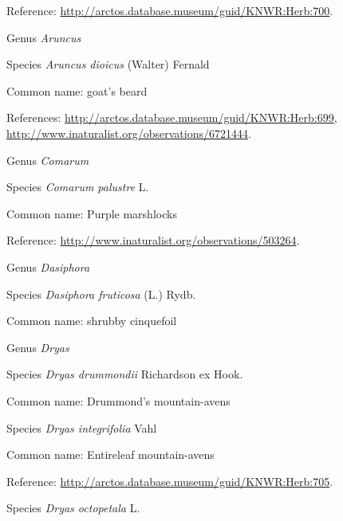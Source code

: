 \documentclass[9pt, article]{memoir}
\begin{document}
\begin{multicols}{2}
Reference: 
\url{http://arctos.database.museum/guid/KNWR:Herb:700}.

\vspace{6pt}\noindent\hspace{30pt}Genus \textit{Aruncus}


\vspace{6pt}\noindent\hspace{36pt}Species \textit{Aruncus dioicus} (Walter) Fernald


Common name: goat's beard

References: 
\url{http://arctos.database.museum/guid/KNWR:Herb:699}, 
\url{http://www.inaturalist.org/observations/6721444}.

\vspace{6pt}\noindent\hspace{30pt}Genus \textit{Comarum}


\vspace{6pt}\noindent\hspace{36pt}Species \textit{Comarum palustre} L.


Common name: Purple marshlocks

Reference: 
\url{http://www.inaturalist.org/observations/503264}.

\vspace{6pt}\noindent\hspace{30pt}Genus \textit{Dasiphora}


\vspace{6pt}\noindent\hspace{36pt}Species \textit{Dasiphora fruticosa} (L.) Rydb.


Common name: shrubby cinquefoil

\vspace{6pt}\noindent\hspace{30pt}Genus \textit{Dryas}


\vspace{6pt}\noindent\hspace{36pt}Species \textit{Dryas drummondii} Richardson ex Hook.


Common name: Drummond's mountain-avens

\vspace{6pt}\noindent\hspace{36pt}Species \textit{Dryas integrifolia} Vahl


Common name: Entireleaf mountain-avens

Reference: 
\url{http://arctos.database.museum/guid/KNWR:Herb:705}.

\vspace{6pt}\noindent\hspace{36pt}Species \textit{Dryas octopetala} L.



\end{multicols}
\end{document}
